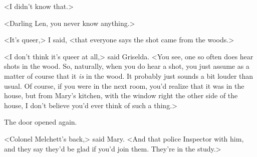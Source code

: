 <I didn't know that.>

<Darling Len, you never know anything.>

<It's queer,> I said, <that everyone says the shot came from the woods.>

<I don't think it's queer at all,> said Griselda. <You see, one so often does hear shots in the wood. So, naturally, when you do hear a shot, you just assume as a matter of course that it \emph{is} in the wood. It probably just sounds a bit louder than usual. Of course, if you were in the next room, you'd realize that it was in the house, but from Mary's kitchen, with the window right the other side of the house, I don't believe you'd ever think of such a thing.>

The door opened again.

<Colonel Melchett's back,> said Mary. <And that police Inspector with him, and they say they'd be glad if you'd join them. They're in the study.>